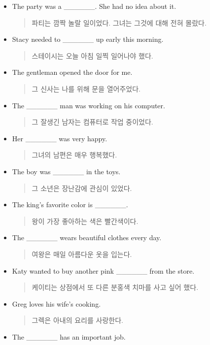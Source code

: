 \documentclass{article}
\begin{document}
\begin{addmargin}[1em]{1em}
\begin{itemize}
    \item The party was a \_\_\_\_\_\_. She had no idea about it.
    \begin{quote}
    파티는 깜짝 놀랄 일이었다. 그녀는 그것에 대해 전혀 몰랐다.
    \end{quote}
    \item Stacy needed to \_\_\_\_\_\_ up early this morning.
    \begin{quote}
    스테이시는 오늘 아침 일찍 일어나야 했다.
    \end{quote}
    \item The gentleman opened the door for me.
    \begin{quote}
    그 신사는 나를 위해 문을 열어주었다.
    \end{quote}
    \item The \_\_\_\_\_\_ man was working on his computer.
    \begin{quote}
    그 잘생긴 남자는 컴퓨터로 작업 중이었다.
    \end{quote}
    \item Her \_\_\_\_\_\_ was very happy.
    \begin{quote}
    그녀의 남편은 매우 행복했다.
    \end{quote}
    \item The boy was \_\_\_\_\_\_ in the toys.
    \begin{quote}
    그 소년은 장난감에 관심이 있었다.
    \end{quote}
    \item The king's favorite color is \_\_\_\_\_\_.
    \begin{quote}
    왕이 가장 좋아하는 색은 빨간색이다.
    \end{quote}
    \item The \_\_\_\_\_\_ wears beautiful clothes every day.
    \begin{quote}
    여왕은 매일 아름다운 옷을 입는다.
    \end{quote}
    \item Katy wanted to buy another pink \_\_\_\_\_\_ from the store.
    \begin{quote}
    케이티는 상점에서 또 다른 분홍색 치마를 사고 싶어 했다.
    \end{quote}
    \item Greg loves his wife's cooking.
    \begin{quote}
    그렉은 아내의 요리를 사랑한다.
    \end{quote}
    \item The \_\_\_\_\_\_ has an important job.

\end{itemize}
\end{addmargin}
\end{document}
